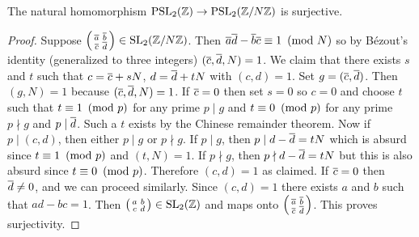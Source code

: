       \begin{proposition}\label{prop:surjective_modulo_N_for_modular_group}
        The natural homomorphism $\mathrm{PSL}_{2}(\mathbb{Z}) \to \mathrm{PSL}_{2}(\mathbb{Z}/N\mathbb{Z})$ is surjective.
      \end{proposition}
      \begin{proof}
        Suppose $\begin{psmallmatrix} \overline{a} & \overline{b} \\ \overline{c} & \overline{d} \end{psmallmatrix} \in \mathrm{SL}_{2}(\mathbb{Z}/N\mathbb{Z})$. Then $\overline{a}\overline{d}-\overline{b}\overline{c} \equiv 1 \ \left(\text{mod }N\right)$ so by B\'ezout's identity (generalized to three integers) $(\overline{c},\overline{d},N) = 1$. We claim that there exists $s$ and $t$ such that $c = \overline{c}+sN$, $d = \overline{d}+tN$ with $(c,d) = 1$. Set $g = (\overline{c},\overline{d})$. Then $(g,N) = 1$ because $(\overline{c},\overline{d},N) = 1$. If $\overline{c} = 0$ then set $s = 0$ so $c = 0$ and choose $t$ such that $t \equiv 1 \ \left(\text{mod }p\right)$ for any prime $p \mid g$ and $t \equiv 0 \ \left(\text{mod }p\right)$ for any prime $p \nmid g$ and $p \mid \overline{d}$. Such a $t$ exists by the Chinese remainder theorem. Now if $p \mid (c,d)$, then either $p \mid g$ or $p \nmid g$. If $p \mid g$, then $p \mid d-\overline{d} = tN$ which is absurd since $t \equiv 1 \ \left(\text{mod }p\right)$ and $(t,N) = 1$. If $p \nmid g$, then $p \nmid d-\overline{d} = tN$ but this is also absurd since $t \equiv 0 \ \left(\text{mod }p\right)$. Therefore $(c,d) = 1$ as claimed. If $\overline{c} = 0$ then $\overline{d} \neq 0$, and we can proceed similarly. Since $(c,d) = 1$ there exists $a$ and $b$ such that $ad-bc = 1$. Then $\begin{psmallmatrix} a & b \\ c & d \end{psmallmatrix} \in \mathrm{SL}_{2}(\mathbb{Z})$ and maps onto $\begin{psmallmatrix} \overline{a} & \overline{b} \\ \overline{c} & \overline{d} \end{psmallmatrix}$. This proves surjectivity.
      \end{proof}
      
